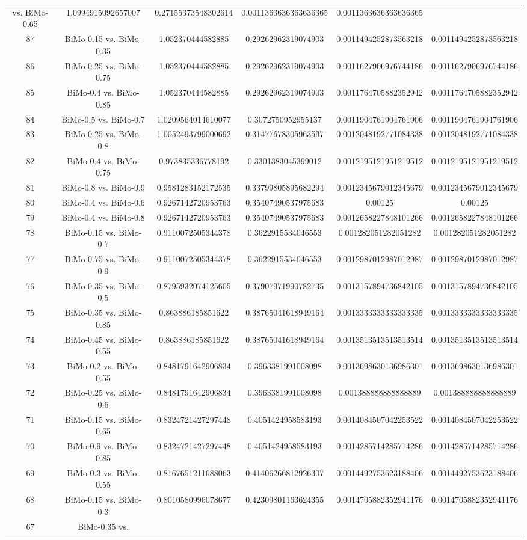 \documentclass[a4paper,10pt]{article}
\begin{document}
\begin{landscape}
\begin{table}[!htp]
\begin{tabular}{cccccc}
vs. BiMo-0.65&1.0994915092657007&0.27155373548302614&0.0011363636363636365&0.0011363636363636365\\87&BiMo-0.15 vs. BiMo-0.35&1.052370444582885&0.29262962319074903&0.0011494252873563218&0.0011494252873563218\\86&BiMo-0.25 vs. BiMo-0.75&1.052370444582885&0.29262962319074903&0.0011627906976744186&0.0011627906976744186\\85&BiMo-0.4 vs. BiMo-0.85&1.052370444582885&0.29262962319074903&0.0011764705882352942&0.0011764705882352942\\84&BiMo-0.5 vs. BiMo-0.7&1.0209564014610077&0.3072750952955137&0.0011904761904761906&0.0011904761904761906\\83&BiMo-0.25 vs. BiMo-0.8&1.0052493799000692&0.31477678305963597&0.0012048192771084338&0.0012048192771084338\\82&BiMo-0.4 vs. BiMo-0.75&0.973835336778192&0.3301383045399012&0.0012195121951219512&0.0012195121951219512\\81&BiMo-0.8 vs. BiMo-0.9&0.9581283152172535&0.33799805895682294&0.0012345679012345679&0.0012345679012345679\\80&BiMo-0.4 vs. BiMo-0.6&0.9267142720953763&0.35407490537975683&0.00125&0.00125\\79&BiMo-0.4 vs. BiMo-0.8&0.9267142720953763&0.35407490537975683&0.0012658227848101266&0.0012658227848101266\\78&BiMo-0.15 vs. BiMo-0.7&0.9110072505344378&0.3622915534046553&0.001282051282051282&0.001282051282051282\\77&BiMo-0.75 vs. BiMo-0.9&0.9110072505344378&0.3622915534046553&0.0012987012987012987&0.0012987012987012987\\76&BiMo-0.35 vs. BiMo-0.5&0.8795932074125605&0.37907971990782735&0.0013157894736842105&0.0013157894736842105\\75&BiMo-0.35 vs. BiMo-0.85&0.863886185851622&0.38765041618949164&0.0013333333333333335&0.0013333333333333335\\74&BiMo-0.45 vs. BiMo-0.55&0.863886185851622&0.38765041618949164&0.0013513513513513514&0.0013513513513513514\\73&BiMo-0.2 vs. BiMo-0.55&0.8481791642906834&0.3963381991008098&0.0013698630136986301&0.0013698630136986301\\72&BiMo-0.25 vs. BiMo-0.6&0.8481791642906834&0.3963381991008098&0.001388888888888889&0.001388888888888889\\71&BiMo-0.15 vs. BiMo-0.65&0.8324721427297448&0.4051424958583193&0.0014084507042253522&0.0014084507042253522\\70&BiMo-0.9 vs. BiMo-0.85&0.8324721427297448&0.4051424958583193&0.0014285714285714286&0.0014285714285714286\\69&BiMo-0.3 vs. BiMo-0.55&0.8167651211688063&0.41406266812926307&0.0014492753623188406&0.0014492753623188406\\68&BiMo-0.15 vs. BiMo-0.3&0.8010580996078677&0.42309801163624355&0.0014705882352941176&0.0014705882352941176\\67&BiMo-0.35 vs. 
\end{tabular}
\end{table}
\end{landscape}
\end{document}
